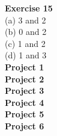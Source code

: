 \documentclass[a4paper, 10pt]{article}
\begin{document}
\textbf{Exercise 15} \\
(a) 3 and 2 \\
(b) 0 and 2 \\
(c) 1 and 2 \\
(d) 1 and 3 \\

\textbf{Project 1} \\


\textbf{Project 2} \\


\textbf{Project 3} \\


\textbf{Project 4} \\


\textbf{Project 5} \\


\textbf{Project 6} \\

\end{document}
